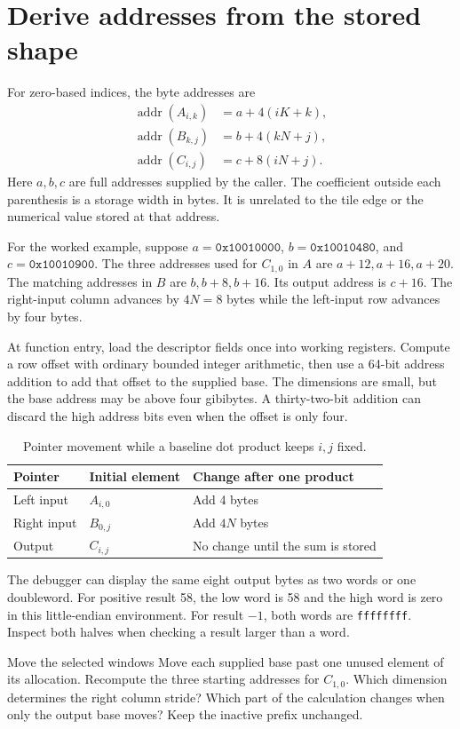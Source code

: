 \section{Derive addresses from the stored shape}
For zero-based indices, the byte addresses are
\begin{align*}
 \operatorname{addr}(A_{i,k})&=a+4(iK+k),\\
 \operatorname{addr}(B_{k,j})&=b+4(kN+j),\\
 \operatorname{addr}(C_{i,j})&=c+8(iN+j).
\end{align*}
Here \(a,b,c\) are full addresses supplied by the caller. The coefficient outside
each parenthesis is a storage width in bytes. It is unrelated to the tile edge or
the numerical value stored at that address.

For the worked example, suppose \(a=\mathtt{0x10010000}\),
\(b=\mathtt{0x10010480}\), and \(c=\mathtt{0x10010900}\).
The three addresses used for \(C_{1,0}\) in \(A\) are \(a+12,a+16,a+20\).
The matching addresses in \(B\) are \(b,b+8,b+16\). Its output address is
\(c+16\). The right-input column advances by \(4N=8\) bytes while the
left-input row advances by four bytes.

At function entry, load the descriptor fields once into working registers.
Compute a row offset with ordinary bounded integer arithmetic, then use a
64-bit address addition to add that offset to the supplied base. The dimensions
are small, but the base address may be above four gibibytes. A thirty-two-bit
addition can discard the high address bits even when the offset is only four.

\begin{table}[htbp]
\centering
\caption{Pointer movement while a baseline dot product keeps \(i,j\) fixed.}
\begin{tabular}{lll}
\toprule
Pointer & Initial element & Change after one product\\
\midrule
Left input & \(A_{i,0}\) & Add 4 bytes\\
Right input & \(B_{0,j}\) & Add \(4N\) bytes\\
Output & \(C_{i,j}\) & No change until the sum is stored\\
\bottomrule
\end{tabular}
\end{table}

The debugger can display the same eight output bytes as two words or one
doubleword. For positive result 58, the low word is 58 and the high word is zero
in this little-endian environment. For result \(-1\), both words are
\texttt{ffffffff}. Inspect both halves when checking a result larger than a word.

\begin{MARSExercise}{Move the selected windows}
Move each supplied base past one unused element of its allocation. Recompute the
three starting addresses for \(C_{1,0}\). Which dimension determines the right
column stride? Which part of the calculation changes when only the output base
moves? Keep the inactive prefix unchanged.
\end{MARSExercise}
